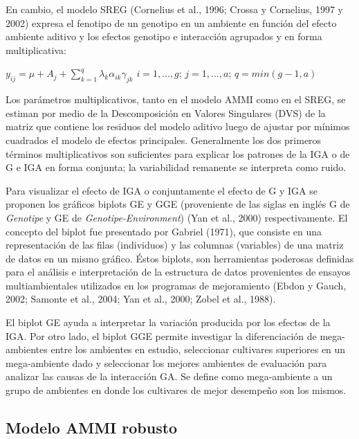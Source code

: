 En cambio, el modelo SREG (Cornelius et al., 1996; Crossa y Cornelius, 1997 y 2002) expresa el fenotipo de un genotipo en un ambiente en función del efecto ambiente aditivo y los efectos genotipo e interacción agrupados y en forma multiplicativa:
\begin{center}
$y_{ij}= \mu +  A_j + \sum_{k=1}^q \lambda_k \alpha_{ik} \gamma_{jk}$ \hspace{0.5cm} $ i=1,...,g$;\hspace{0.15cm} $ j=1,...,a$; \hspace{0.15cm} $q=min(g-1,a)$
\end{center} 

Los parámetros multiplicativos, tanto en el modelo AMMI como en el SREG, se estiman por medio de la Descomposición en Valores Singulares (DVS) de la matriz que contiene los residuos del modelo aditivo luego de ajustar por mínimos cuadrados el modelo de efectos principales. Generalmente los dos primeros términos multiplicativos son suficientes para explicar los patrones de la IGA o de G e IGA en forma conjunta; la variabilidad remanente se interpreta como ruido. 

Para visualizar el efecto de IGA o conjuntamente el efecto de G y IGA se proponen los gráficos biplots GE y GGE (proveniente de las siglas en inglés G de \emph{Genotipe} y GE de \emph{Genotipe-Environment}) (Yan et al., 2000) respectivamente. El concepto del biplot fue presentado por Gabriel (1971), que consiste en una representación de las filas (individuos) y las columnas (variables) de una matriz de datos en un mismo gráfico. Éstos biplots, son herramientas poderosas definidas para el análisis e interpretación de la estructura de datos provenientes de ensayos multiambientales utilizados en los programas de mejoramiento (Ebdon y Gauch, 2002; Samonte et al., 2004; Yan et al., 2000; Zobel et al., 1988).

El biplot GE ayuda a interpretar la variación producida por los efectos de la IGA. Por otro lado, el biplot GGE permite investigar la diferenciación de mega-ambientes entre los ambientes en estudio, seleccionar cultivares superiores en un mega-ambiente dado y seleccionar los mejores ambientes de evaluación para analizar las causas de la interacción GA. Se define como mega-ambiente a un grupo de ambientes en donde los cultivares de mejor desempeño son los mismos.


\subsection{Modelo AMMI robusto}

